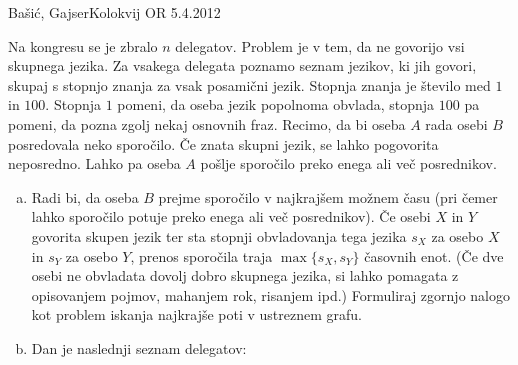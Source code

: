 \begin{naloga}{Bašić, Gajser}{Kolokvij OR 5.4.2012}
\begin{vprasanje}
Na kongresu se je zbralo $n$ delegatov.
Problem je v tem, da ne govorijo vsi skup\-ne\-ga jezika.
Za vsakega delegata poznamo seznam jezikov, ki jih govori,
skupaj s stopnjo znanja za vsak posamični jezik.
Stopnja znanja je število med $1$ in $100$.
Stopnja $1$ pomeni, da oseba jezik popolnoma obvlada,
stopnja $100$ pa pomeni, da pozna zgolj nekaj osnovnih fraz.
Recimo, da bi oseba $A$ rada osebi $B$ posredovala neko sporočilo.
Če znata skupni jezik, se lahko pogovorita neposredno.
Lahko pa oseba $A$ pošlje sporočilo preko enega ali več posrednikov.

\begin{enumerate}[(a)]
\item Radi bi, da oseba $B$ prejme sporočilo v najkrajšem možnem času
(pri čemer lahko sporočilo potuje preko enega ali več posrednikov).
Če osebi $X$ in $Y$ govorita skupen jezik
ter sta stopnji obvladovanja tega jezika
$s_X$ za osebo $X$ in $s_Y$ za osebo $Y$,
prenos sporočila traja $\max\{s_X, s_Y\}$ časovnih enot.
(Če dve osebi ne obvladata dovolj dobro skupnega jezika,
si lahko pomagata z opisovanjem pojmov, mahanjem rok, risanjem ipd.)
Formuliraj zgornjo nalogo
kot problem iskanja najkrajše poti v ustreznem grafu.

\item Dan je naslednji seznam delegatov:

\smallskip
{}


\end{enumerate}
\end{vprasanje}
\end{naloga}
